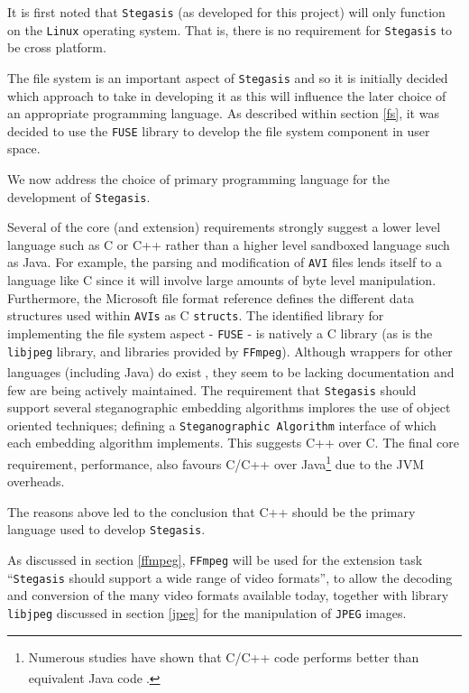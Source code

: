 \documentclass[paper=a4, fontsize=11pt,twoside]{scrartcl}
\numberwithin{table}{section}
\numberwithin{figure}{section}
\numberwithin{algorithm}{section}
\begin{document}
It is first noted that \texttt{Stegasis} (as developed for this project) will only function on the \texttt{Linux} operating system. That is, there is no requirement for \texttt{Stegasis} to be cross platform.  

The file system is an important aspect of \texttt{Stegasis} and so it is initially decided which approach to take in developing it as this will influence the later choice of an appropriate programming language. As described within section \ref{fs}, it was decided to use the \texttt{FUSE} library to develop the file system component in user space.

We now address the choice of primary programming language for the development of \texttt{Stegasis}.

Several of the core (and extension) requirements strongly suggest a lower level language such as C or C++ rather than a higher level sandboxed language such as Java. For example, the parsing and modification of \texttt{AVI} files lends itself to a language like C since it will involve large amounts of byte level manipulation. Furthermore, the Microsoft file format reference defines the different data structures used within \texttt{AVIs} as C \texttt{structs}. The identified library for implementing the file system aspect - \texttt{FUSE} - is natively a C library (as is the \texttt{libjpeg} library, and libraries provided by \texttt{FFmpeg}). Although wrappers for other languages (including Java) do exist\textsuperscript{\cite{javafuse} \cite{turbojpeg}}, they seem to be lacking documentation and few are being actively maintained. The requirement that \texttt{Stegasis} should support several steganographic embedding algorithms implores the use of object oriented techniques; defining a \texttt{Steganographic Algorithm} interface of which each embedding algorithm implements. This suggests C++ over C. The final core requirement, performance, also favours C/C++ over Java\footnote{Numerous studies have shown that C/C++ code performs better than equivalent Java code\textsuperscript{\cite{javaper1} \cite{javaper2} \cite{javaper3}}.} due to the JVM overheads. 

The reasons above led to the conclusion that C++ should be the primary language used to develop \texttt{Stegasis}.

As discussed in section \ref{ffmpeg}, \texttt{FFmpeg} will be used for the extension task ``\texttt{Stegasis} should support a wide range of video formats'', to allow the decoding and conversion of the many video formats available today, together with library \texttt{libjpeg} discussed in section \ref{jpeg} for the manipulation of \texttt{JPEG} images. 
\end{document}
